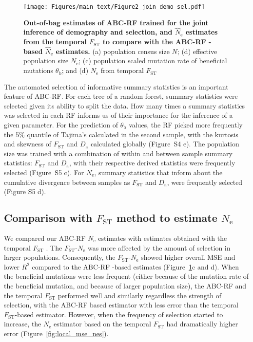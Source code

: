 \documentclass[a4paper, 12pt]{article}
\begin{document}
\begin{figure}[ht]
  \centering
  \texttt{[image: Figures/main\_text/Figure2\_join\_demo\_sel.pdf]}
  \small\caption{\textbf{Out-of-bag estimates of ABC-RF trained for the joint inference of demography and selection, and $\hat N_{\mathrm{e}}$ estimates from the temporal $F_{\mathrm{ST}}$ to compare with the ABC-RF -based $\hat N_{\mathrm{e}}$ estimates.}
  (a) population census size $N$; (d) effective population size $N_{\mathrm{e}}$; (c) population scaled mutation rate of beneficial mutations $\theta_\mathrm{b}$; and (d) $N_{\mathrm{e}}$ from temporal $F_{\mathrm{ST}}$}
  \label{fig:oob_jointDemoSel}
\end{figure}

The automated selection of informative summary statistics is an important feature of ABC-RF. For each tree of a random forest, summary statistics were selected given its ability to split the data. How many times a summary statistics was selected in each RF informs us of their importance for the inference of a given parameter. For the prediction of $\theta_{\mathrm{b}}$ values, the RF picked more frequently the 5\% quantile of Tajima's calculated in the second sample, with the kurtosis and skewness of $F_{\mathrm{ST}}$ and $D_{\mathrm{a}}$ calculated globally (Figure~S4 e). The population size was trained with a combination of within and between sample summary statistics: $F_{\mathrm{ST}}$ and $D_{\mathrm{a}}$, with their respective derived statistics were frequently selected (Figure~S5 c). For $N_{\mathrm{e}}$, summary statistics that inform about the cumulative divergence between samples as $F_{\mathrm{ST}}$ and $D_{\mathrm{a}}$, were frequently selected (Figure S5 d).

\subsection*{Comparison with $F_{\mathrm{ST}}$ method to estimate $N_\mathrm{e}$}

We compared our ABC-RF $N_\mathrm{e}$ estimates with estimates obtained with the temporal $F_\mathrm{ST}$ \citep{Frachon:2017fw}. The $F_{\mathrm{ST}}$-$N_\mathrm{e}$ was more affected by the amount of selection in larger populations. Consequently, the $F_{\mathrm{ST}}$-$N_\mathrm{e}$ showed higher overall MSE and lower $R^2$ compared to the ABC-RF -based estimates (Figure~\ref{fig:oob_jointDemoSel}c and d). When the beneficial mutations were less frequent (either because of the mutation rate of the beneficial mutation, and because of larger population size), the ABC-RF and the temporal $F_{\mathrm{ST}}$ performed well and similarly regardless the strength of selection, with the ABC-RF based estimator with less error than the temporal $F_{\mathrm{ST}}$-based estimator. However, when the frequency of selection started to increase, the $N_{\mathrm{e}}$ estimator based on the temporal $F_{\mathrm{ST}}$ had dramatically higher error (Figure~\ref{fig:local_mse_nes}).
\end{document}
